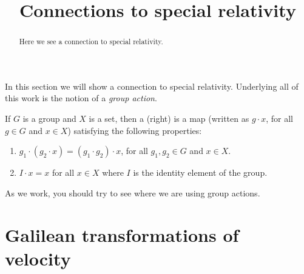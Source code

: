 \documentclass{ximera}
\title{Connections to special relativity}
\begin{document}
\begin{abstract}
Here we see a connection to special relativity.
\end{abstract}
\maketitle

In this section we will show a connection to special relativity. Underlying all of this work is the notion of a \textit{group action}.

\begin{definition}
  If $G$ is a group and $X$ is a set, then a (right)   is a map (written as $g\cdot x$, for all $g\in G$ and $x\in X$) satisfying the following properties:
  \begin{enumerate}
  \item $g_1\cdot(g_2\cdot x) = (g_1\cdot g_2)\cdot x$, for all $g_1,
    g_2\in G$ and $x\in X$.
  \item $I\cdot x = x$ for all $x\in X$ where $I$ is the identity
    element of the group.
  \end{enumerate}
\end{definition}
As we work, you should try to see where we are using group actions.

\section{Galilean transformations of velocity}
\end{document}
